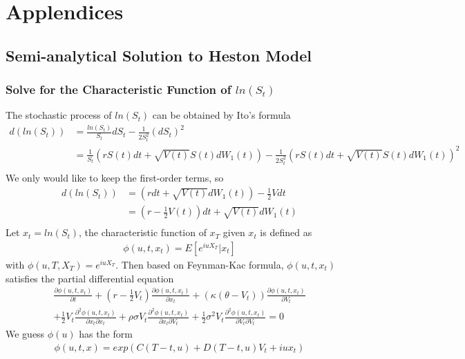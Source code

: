 \documentclass[a4paper]{article}
\begin{document}
\appendix
\section{Applendices}
\subsection{Semi-analytical Solution to Heston Model}
\subsubsection{Solve for the Characteristic Function of $ln(S_t)$}
The stochastic process of $ln(S_t)$ can be obtained by Ito's formula
\begin{align*}
	d(ln(S_t)) & = \frac{ln(S_t)}{S_t} dS_t - \frac{1}{2S_t^2} (dS_t)^2 \\
		   & = \frac{1}{S_t} (rS(t)dt + \sqrt{V(t)}S(t)dW_1(t))
		      - \frac{1}{2S_t^2} (rS(t)dt + \sqrt{V(t)}S(t)dW_1(t))^2 \\
\end{align*}
We only would like to keep the first-order terms, so
\begin{align*}
	d(ln(S_t)) & = (r dt + \sqrt{V(t)}dW_1(t)) - \frac{1}{2}V dt \\
		  & = (r - \frac{1}{2}V(t)) dt + \sqrt{V(t)} dW_1(t) \\
\end{align*}
Let $x_t = ln(S_t)$, the characteristic function of $x_T$ given $x_t$ is defined as
\begin{align*}
	\phi(u, t, x_t) = E[e^{iuX_T}|x_t]
\end{align*}
with $\phi(u, T, X_T) = e^{iuX_T}$. Then based on Feynman-Kac formula, $\phi(u, t, x_t)$ satisfies the partial
differential equation
\begin{align}
	\frac{\partial \phi(u, t, x_t)}{\partial t} + (r - \frac{1}{2}V_t)\frac{\partial \phi(u, t, x_t)}{\partial x_t} 
	+ (\kappa(\theta-V_t)) \frac{\partial \phi(u, t, x_t)}{ \partial V_t}   \nonumber \\ 
	+ \frac{1}{2}  V_t \frac{\partial^2 \phi(u, t, x_t)}{ \partial x_t \partial x_t } 
	+ \rho \sigma V_t \frac{\partial^2 \phi(u, t, x_t)}{ \partial x_t \partial V_t}
	+\frac{1}{2} \sigma^2 V_t \frac{\partial^2 \phi(u, t, x_t)}{ \partial V_t \partial V_t}  = 0 \label{characteristic_pde1}
\end{align}
We guess $\phi(u)$ has the form 
\begin{align}
	\phi(u,t, x) = exp(C(T-t, u) + D(T-t, u)V_t + iux_t) \label{phi}
\end{align}
\end{document}
